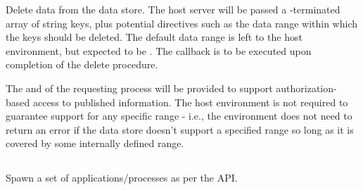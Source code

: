 
\optattrend

\descr

Delete data from the data store.
The host server will be passed a -terminated array of string keys, plus potential directives such as the data range within which the keys should be deleted. The default data range is left to the host environment, but expected to be .
The callback is to be executed upon completion of the delete procedure.

\advicermstart
The  and  of the requesting process will be provided to support authorization-based access to published information. The host environment is not required to guarantee support for any specific range - i.e., the environment does not need to return an error if the data store doesn't support a specified range so long as it is covered by some internally defined range.
\advicermend


\subsection{}

\summary

Spawn a set of applications/processes as per the  API.

\format


